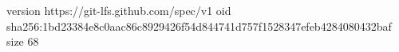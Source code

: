 version https://git-lfs.github.com/spec/v1
oid sha256:1bd23384e8c0aac86c8929426f54d844741d757f1528347efeb4284080432baf
size 68
